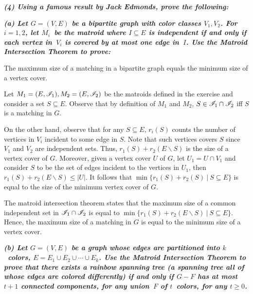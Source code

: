 \textbf{\textit{(4) Using a famous result by Jack Edmonds, prove the following:}}

\hspace{5pt}\textbf{\textit{(a) Let $G=(V,E)$ be a bipartite graph with color classes $V_1,V_2$. For $i=1,2$, let $M_i$~be the matroid where $I\subseteq E$ is independent if and only if each vertex in~$V_i$ is covered by at most one edge in~$I$. Use the Matroid Intersection Theorem to prove:}}
    \begin{theoremstar}
      The maximum size of a matching in a bipartite graph equals the minimum size of a vertex cover.
    \end{theoremstar}

\vspace{3pt}

Let $M_1=(E,\mathscr{I}_1), M_2=(E,\mathscr{I}_2)$ be the matroids defined in the exercise and consider a set $S\subseteq E$. Observe that by definition of $M_1$ and $M_2$, $S\in \mathscr{I}_1\cap \mathscr{I}_2$ iff $S$ is a matching in $G$.

On the other hand, observe that for any $S\subseteq E$, $r_i(S)$ counts the number of vertices in $V_i$ incident to some edge in $S$. Note that such vertices covers $S$ since $V_1$ and $V_2$ are independent sets. Thus, $r_1(S)+r_2(E \backslash S)$ is the size of a vertex cover of $G$. Moreover, given a vertex cover $U$ of $G$, let $U_1=U\cap V_1$ and consider $S$ to be the set of edges incident to the vertices in $U_1$, then $r_1(S)+r_2(E \backslash S)\leq |U|$. It follows that $\min\{r_1(S)+r_2(S) \ | \ S\subseteq E\}$ is equal to the size of the minimum vertex cover of $G$.

The matroid intersection theorem states that the maximum size of a common independent set in $\mathscr{I}_1\cap \mathscr{I}_2$ is equal to $\min\{r_1(S)+r_2(E \backslash S) \ | \ S\subseteq E\}$. Hence, the maximum size of a matching in $G$ is equal to the minimum size of a vertex cover.

\vspace{3pt}

\hspace{5pt}\textbf{\textit{(b) Let $G=(V,E)$ be a graph whose edges are partitioned into $k$~colors, $E=E_1\cup E_2\cup\cdots\cup E_k$. Use the Matroid Intersection Theorem to prove that there exists a rainbow spanning tree (a spanning tree all of whose edges are colored differently) if and only if $G-F$ has at most $t+1$ connected components, for any union~$F$ of $t$~colors, for any $t\ge0$.}}

